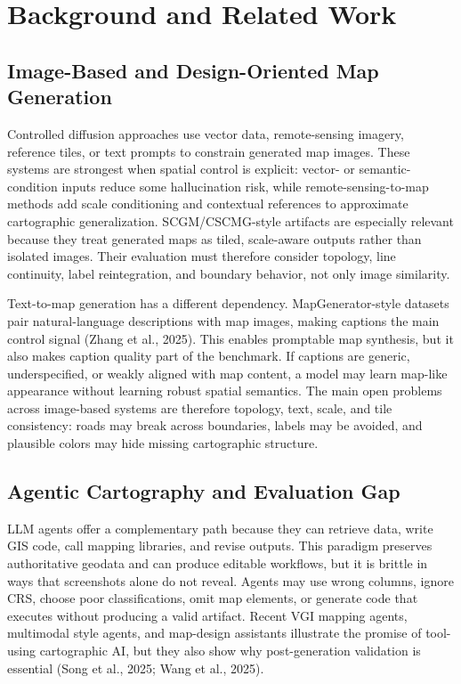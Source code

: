 \documentclass[]{interact}
\begin{document}
\section{Background and Related Work}

\subsection{Image-Based and Design-Oriented Map Generation}

Controlled diffusion approaches use vector data, remote-sensing imagery, reference tiles, or text prompts to constrain generated map images. These systems are strongest when spatial control is explicit: vector- or semantic-condition inputs reduce some hallucination risk, while remote-sensing-to-map methods add scale conditioning and contextual references to approximate cartographic generalization. SCGM/CSCMG-style artifacts are especially relevant because they treat generated maps as tiled, scale-aware outputs rather than isolated images. Their evaluation must therefore consider topology, line continuity, label reintegration, and boundary behavior, not only image similarity.

Text-to-map generation has a different dependency. MapGenerator-style datasets pair natural-language descriptions with map images, making captions the main control signal (Zhang et al., 2025). This enables promptable map synthesis, but it also makes caption quality part of the benchmark. If captions are generic, underspecified, or weakly aligned with map content, a model may learn map-like appearance without learning robust spatial semantics. The main open problems across image-based systems are therefore topology, text, scale, and tile consistency: roads may break across boundaries, labels may be avoided, and plausible colors may hide missing cartographic structure.

\subsection{Agentic Cartography and Evaluation Gap}

LLM agents offer a complementary path because they can retrieve data, write GIS code, call mapping libraries, and revise outputs. This paradigm preserves authoritative geodata and can produce editable workflows, but it is brittle in ways that screenshots alone do not reveal. Agents may use wrong columns, ignore CRS, choose poor classifications, omit map elements, or generate code that executes without producing a valid artifact. Recent VGI mapping agents, multimodal style agents, and map-design assistants illustrate the promise of tool-using cartographic AI, but they also show why post-generation validation is essential (Song et al., 2025; Wang et al., 2025).
\end{document}
